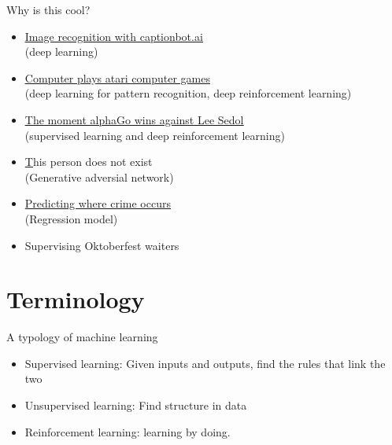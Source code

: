 \documentclass[color=usenames,dvipsnames]{beamer}
\begin{document}
\begin{frame}{Why is this cool?} 


\begin{itemize}
	
	\item \href{https://www.captionbot.ai/}{\underline{Image recognition with captionbot.ai}}\\
			(deep learning)\\

	\item \href{https://www.youtube.com/watch?time_continue=2&v=TmPfTpjtdgg}{\underline{Computer plays atari computer games}}\\ 
			(deep learning for 	pattern recognition, deep reinforcement learning)\\

	\item \href{https://youtu.be/rOL6QJdAlm8?t=103}{\underline{The moment alphaGo wins against Lee Sedol}}\\
			(supervised learning and deep reinforcement learning)\\
			
	\item \href{https://www.thispersondoesnotexist.com/}This person does not exist\\
		(Generative adversial network)
	
	\item \href{https://www.predpol.com/}{Predicting where crime occurs}\\
		(Regression model)\\
		
	\item Supervising Oktoberfest waiters
	
\end{itemize}

\end{frame}

\section{Terminology}


\begin{frame}{A typology of machine learning} 


\begin{itemize}
	
	\item Supervised learning: Given inputs and outputs, find the rules that link the two
	\item Unsupervised learning: Find structure in data
	\item Reinforcement learning: learning by doing.
	
\end{itemize}

\end{frame}
\end{document}
